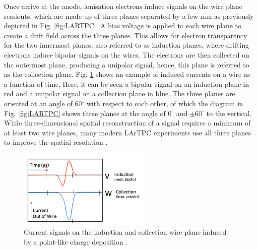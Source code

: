 Once arrive at the anode, ionisation electrons induce signals on the wire plane readouts, which are made up of three planes separated by a few mm as previously depicted in Fig. \ref{fig:LARTPC}.
A bias voltage is applied to each wire plane to create a drift field across the three planes.
This allows for electron transparency for the two innermost planes, also referred to as induction planes, where drifting electrons induce bipolar signals on the wires.
The electrons are then collected on the outermost plane, producing a unipolar signal, hence, this plane is referred to as the collection plane.
Fig. \ref{fig:wire_current} shows an example of induced currents on a wire as a function of time.
Here, it can be seen a bipolar signal on an induction plane in red and a unipolar signal on a collection plane in blue.
The three planes are oriented at an angle of 60$^{\circ}$ with respect to each other, of which the diagram in Fig. \ref{fig:LARTPC} shows three planes at the angle of $0^{\circ}$ and $\pm60^{\circ}$ to the vertical.                                                                                                                                                                                          
While three-dimensional spatial reconstruction of a signal requires a minimum of at least two wire planes, many modern LArTPC experiments use all three planes to improve the spatial resolution \cite{argoneut, icarus_det, ubooneDet, sbnd_det, protodune, dunefd_det}.

\begin{figure}[ht] 
\centering    
\includegraphics[width=0.57\textwidth]{wire_current}
\caption[Induced Currents on an Induction and a Collection Wire Plane]{
Current signals on the induction and collection wire plane induced by a point-like charge deposition \cite{argoneut}.
\hfill
\break
}
\label{fig:wire_current}
\end{figure}


